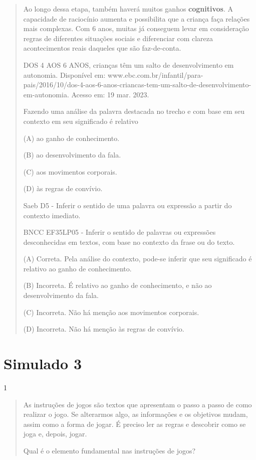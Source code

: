\begin{itemize}
{{{\begin{itemize}
\begin{itemize}
\begin{itemize}
\begin{quote}
Ao longo dessa etapa, também haverá muitos ganhos \textbf{cognitivos}. A
capacidade de raciocínio aumenta e possibilita que a criança faça
relações mais complexas. Com 6 anos, muitas já conseguem levar em
consideração regras de diferentes situações sociais e diferenciar com
clareza acontecimentos reais daqueles que são faz-de-conta.

DOS 4 AOS 6 ANOS, crianças têm um salto de desenvolvimento em autonomia.
Disponível em:
www.ebc.com.br/infantil/para-pais/2016/10/dos-4-aos-6-anos-criancas-tem-um-salto-de-desenvolvimento-em-autonomia.
Acesso em: 19 mar. 2023.

Fazendo uma análise da palavra destacada no trecho e com base em seu
contexto em seu significado é relativo

(A) ao ganho de conhecimento.

(B) ao desenvolvimento da fala.

(C) aos movimentos corporais.

(D) às regras de convívio.

Saeb D5 - Inferir o sentido de uma palavra ou expressão a partir do
contexto imediato.

BNCC EF35LP05 - Inferir o sentido de palavras ou expressões
desconhecidas em textos, com base no contexto da frase ou do texto.

(A) Correta. Pela análise do contexto, pode-se inferir que seu
significado é relativo ao ganho de conhecimento.

(B) Incorreta. É relativo ao ganho de conhecimento, e não ao
desenvolvimento da fala.

(C) Incorreta. Não há menção aos movimentos corporais.

(D) Incorreta. Não há menção às regras de convívio.
\end{quote}

\chapter{Simulado 3}

\num{1}

\begin{quote}
As instruções de jogos são textos que apresentam o passo a passo de como
realizar o jogo. Se alterarmos algo, as informações e os objetivos
mudam, assim como a forma de jogar. É preciso ler as regras e descobrir
como se joga e, depois, jogar.

Qual é o elemento fundamental nas instruções de jogos?


\end{quote}
\end{itemize}
\end{itemize}
\end{itemize}}}}
\end{itemize}
